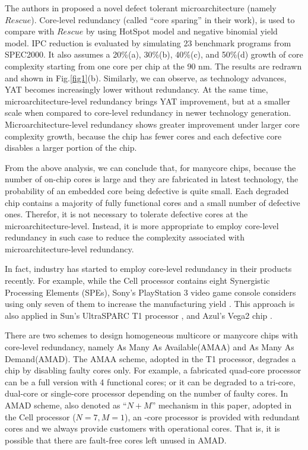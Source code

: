 The authors in \cite{schuchman2005rescue} proposed a novel defect tolerant microarchitecture (namely $Rescue$). Core-level redundancy (called “core sparing” in their work), is used to compare with $Rescue$ by using HotSpot model and negative binomial yield model. IPC reduction is evaluated by simulating 23 benchmark programs from SPEC2000. It also assumes a 20\%(a), 30\%(b), 40\%(c), and 50\%(d) growth of core complexity starting from one core per chip at the 90 nm. The results are redrawn and shown in Fig.\ref{fig1}(b). Similarly, we can observe, as technology advances, YAT becomes increasingly lower without redundancy. At the same time, microarchitecture-level redundancy brings YAT improvement, but at a smaller scale when compared to core-level redundancy in newer technology generation. Microarchitecture-level redundancy shows greater improvement under larger core complexity growth, because the chip has fewer cores and each defective core disables a larger portion of the chip.

From the above analysis, we can conclude that, for manycore chips, because the number of on-chip cores is large and they are fabricated in latest technology, the probability of an embedded core being defective is quite small. Each degraded chip contains a majority of fully functional cores and a small number of defective ones. Therefor, it is not necessary to tolerate defective cores at the microarchitecture-level. Instead, it is more appropriate to employ core-level redundancy in such case to reduce the complexity associated with microarchitecture-level redundancy.

In fact, industry has started to employ core-level redundancy in their products recently. For example, while the Cell processor contains eight Synergistic Processing Elements (SPEs), Sony’s PlayStation 3 video game console considers using only seven of them to increase the manufacturing yield \cite{sperling2007turn}. This approach is also applied in Sun’s UltraSPARC T1 processor \cite{parulkar2002scalable}, \cite{tan2006testing} and Azul’s Vega2 chip \cite{makar2007testing}.

There are two schemes to design homogeneous multicore or manycore chips with core-level redundancy, namely As Many As Available(AMAA) and As Many As Demand(AMAD). The AMAA scheme, adopted in the T1 processor, degrades a chip by disabling faulty cores only. For example, a fabricated quad-core processor can be a full version with 4 functional cores; or it can be degraded to a tri-core, dual-core or single-core processor depending on the number of faulty cores. In AMAD scheme, also denoted as “$N+M$” mechanism in this paper, adopted in the Cell processor ($N=7, M=1$), an -core processor is provided with redundant cores and we always provide customers with operational cores. That is, it is possible that there are fault-free cores left unused in AMAD.

